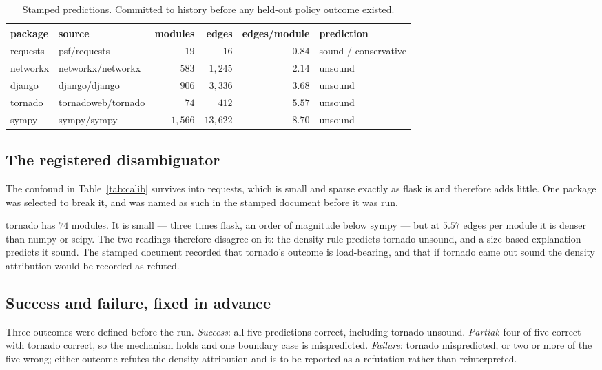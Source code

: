 \documentclass[11pt]{article}
\begin{document}
\begin{table}[h]
\centering
\begin{tabular}{llrrrl}
\toprule
package & source & modules & edges & edges/module & prediction \\
\midrule
requests & psf/requests & $19$ & $16$ & $0.84$ & sound / conservative \\
networkx & networkx/networkx & $583$ & $1{,}245$ & $2.14$ & unsound \\
django & django/django & $906$ & $3{,}336$ & $3.68$ & unsound \\
tornado & tornadoweb/tornado & $74$ & $412$ & $5.57$ & unsound \\
sympy & sympy/sympy & $1{,}566$ & $13{,}622$ & $8.70$ & unsound \\
\bottomrule
\end{tabular}
\caption{Stamped predictions. Committed to history before any held-out policy outcome existed.}
\label{tab:pred}
\end{table}

\subsection{The registered disambiguator}
The confound in Table~\ref{tab:calib} survives into requests, which is small and sparse exactly as flask is and therefore adds little. One package was selected to break it, and was named as such in the stamped document before it was run.

tornado has $74$ modules. It is small --- three times flask, an order of magnitude below sympy --- but at $5.57$ edges per module it is denser than numpy or scipy. The two readings therefore disagree on it: the density rule predicts tornado unsound, and a size-based explanation predicts it sound. The stamped document recorded that tornado's outcome is load-bearing, and that if tornado came out sound the density attribution would be recorded as refuted.

\subsection{Success and failure, fixed in advance}
Three outcomes were defined before the run. \emph{Success}: all five predictions correct, including tornado unsound. \emph{Partial}: four of five correct with tornado correct, so the mechanism holds and one boundary case is mispredicted. \emph{Failure}: tornado mispredicted, or two or more of the five wrong; either outcome refutes the density attribution and is to be reported as a refutation rather than reinterpreted.
\end{document}
